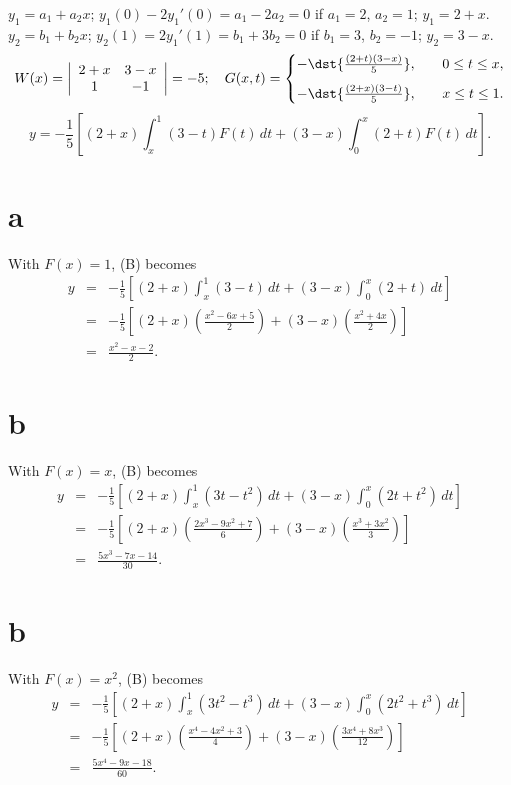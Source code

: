 \documentclass[dvips]{book}
\renewcommand{\exer}[1]{\par\medskip\;\noindent{\color{red}\bf #1.}}
\numberwithin{example}{section}
\numberwithin{equation}{section}
\numberwithin{theorem}{section}
\numberwithin{table}{section}
\numberwithin{figure}{section}
\begin{document}
\exer{13.1.22}
$y_{1}=a_{1}+a_{2}x$; $y_{1}(0)-2y_{1}'(0)=a_{1}-2a_{2}=0$  if $a_{1}=2$,
$a_{2}=1$;
$y_{1}=2+x$. $y_{2}=b_{1}+b_{2}x$; $y_{2}(1)=2y_{1}'(1)=b_{1}+3b_{2}=0$
if $b_{1}=3$, $b_{2}=-1$;  $y_{2}=3-x$.
$$
W(x)=
\left|\begin{array}{ccccccc}
2+x&3-x\\1&-1
\end{array}\right|=-5;\quad
G(x,t)=
\begin{cases}
-\dst{\frac{(2+t)(3-x)}{5}}, &\quad 0\le t\le x,\\[.1in]
-\dst{\frac{(2+x)(3-t)}{5}}, &\quad x\le t\le 1.
\end{cases}
$$
\begin{equation}
y=-\frac{1}{5}\left[(2+x)\int_{x}^{1}(3-t)F(t)\,dt+(3-x)\int_{0}^{x}(2+t)F(t)\,dt\right].\tag{B}
\end{equation}

\part{a}
With $F(x)=1$, (B)  becomes
\begin{eqnarray*}
y&=&-\frac{1}{5}\left[(2+x)\int_{x}^{1}(3-t)\,dt+(3-x)\int_{0}^{x}(2+t)\,dt\right]\\
&=&-\frac{1}{5}\left[(2+x)\left(\frac{x^{2}-6x+5}{2}\right)
+(3-x)\left(\frac{x^{2}+4x}{2}\right)\right] \\
&=&\frac{x^{2}-x-2}{2}.
\end{eqnarray*}

\part{b}
With $F(x)=x$, (B)  becomes
\begin{eqnarray*}
y&=&-\frac{1}{5}\left[(2+x)\int_{x}^{1}(3t-t^{2})\,dt+(3-x)\int_{0}^{x}(2t+t^{2})\,dt\right]\\
&=&-\frac{1}{5}\left[(2+x)\left(\frac{2x^{3}-9x^{2}+7}{6}\right)
+(3-x)\left(\frac{x^{3}+3x^{2}}{3}\right)\right] \\
&=&\frac{5x^{3}-7x-14}{30}.
\end{eqnarray*}

\part{b}
With $F(x)=x^{2}$, (B)  becomes
\begin{eqnarray*}
y&=&-\frac{1}{5}\left[(2+x)\int_{x}^{1}(3t^{2}-t^{3})\,dt+(3-x)\int_{0}^{x}(2t^{2}+t^{3})\,dt\right]\\
&=&-\frac{1}{5}\left[(2+x)\left(\frac{x^{4}-4x^{2}+3}{4}\right)
+(3-x)\left(\frac{3x^{4}+8x^{3}}{12}\right)\right] \\
&=&\frac{5x^{4}-9x-18}{60}.
\end{eqnarray*}
\end{document}
